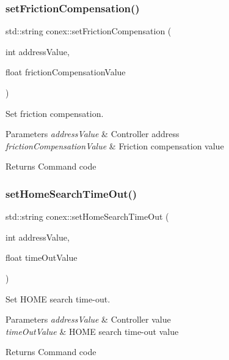 \subsubsection{\texorpdfstring{set\+Friction\+Compensation()}{setFrictionCompensation()}}
{\footnotesize\ttfamily std\+::string conex\+::set\+Friction\+Compensation (\begin{DoxyParamCaption}\item[{int}]{address\+Value,  }\item[{float}]{friction\+Compensation\+Value }\end{DoxyParamCaption})}



Set friction compensation. 


\begin{DoxyParams}{Parameters}
{\em address\+Value} & Controller address \\
\hline
{\em friction\+Compensation\+Value} & Friction compensation value \\
\hline
\end{DoxyParams}
\begin{DoxyReturn}{Returns}
Command code 
\end{DoxyReturn}
\mbox{\label{namespaceconex_a55f14dbf89cbe71b6d0934eef1a97d1b}} 
\subsubsection{\texorpdfstring{set\+Home\+Search\+Time\+Out()}{setHomeSearchTimeOut()}}
{\footnotesize\ttfamily std\+::string conex\+::set\+Home\+Search\+Time\+Out (\begin{DoxyParamCaption}\item[{int}]{address\+Value,  }\item[{float}]{time\+Out\+Value }\end{DoxyParamCaption})}



Set H\+O\+ME search time-\/out. 


\begin{DoxyParams}{Parameters}
{\em address\+Value} & Controller value \\
\hline
{\em time\+Out\+Value} & H\+O\+ME search time-\/out value \\
\hline
\end{DoxyParams}
\begin{DoxyReturn}{Returns}
Command code 
\end{DoxyReturn}
\mbox{\label{namespaceconex_a2b7cd3e7462a4a8f2ba9e48ea5b5c450}} 
